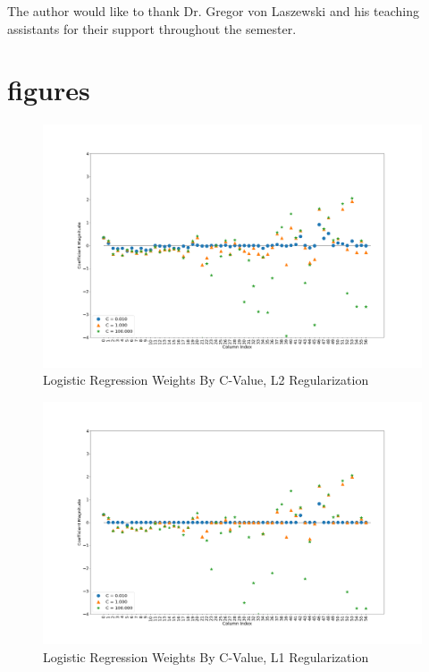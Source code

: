 \documentclass[sigconf]{acmart}
\begin{document}
\begin{acks}

The author would like to thank Dr. Gregor von Laszewski and his teaching assistants for their support throughout the semester.

\end{acks}




\section{figures}

\begin{figure}[!ht]
  \centering\includegraphics[width=\columnwidth]{images/weightsl2.png}
  \caption{Logistic Regression Weights By C-Value, L2 Regularization}\label{f:weightsl2}
\end{figure}

\begin{figure}[!ht]
  \centering\includegraphics[width=\columnwidth]{images/weightsl1.png}
  \caption{Logistic Regression Weights By C-Value, L1 Regularization}\label{f:weightsl1}
\end{figure}
\end{document}
